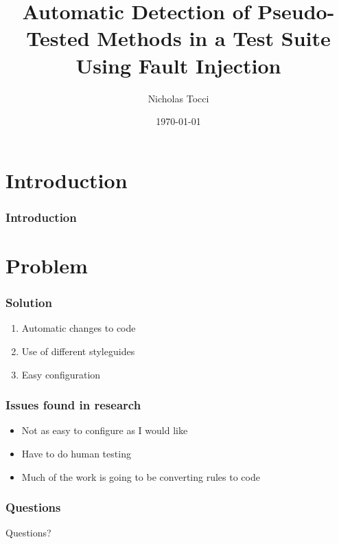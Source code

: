 \documentclass{beamer}
\title{Automatic Detection of Pseudo-Tested Methods in a Test Suite Using Fault Injection}
\author{Nicholas Tocci}
\date{\today}
\begin{document}
\section{Introduction}
\begin{frame}
	\frametitle{Introduction}
	\titlepage
\end{frame}
\section{Problem}
\label{sec:problem}


\begin{frame}
	\frametitle{Solution}
	\begin{enumerate}
		\item{Automatic changes to code}
		\item{Use of different styleguides}
		\item{Easy configuration}
	\end{enumerate}
\end{frame}
\begin{frame}
	\frametitle{Issues found in research}
	\begin{itemize}
		\item{Not as easy to configure as I would like}
		\item{Have to do human testing}
		\item{Much of the work is going to be converting rules to code}
	\end{itemize}
\end{frame}
\begin{frame}
	\frametitle{Questions}
	\begin{center}
		\huge{Questions?}
	\end{center}
\end{frame}
\end{document}
